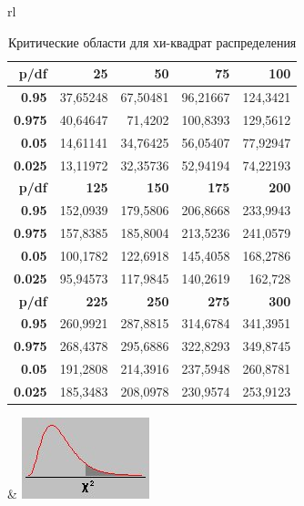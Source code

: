 \documentclass[financial_risks_lectures.tex]{subfiles}
\begin{document}
\begin{frame}[shrink=15]
\begin{table}[htbp]
  \centering
  \caption{Критические области для хи-квадрат распределения}
\begin{tabular}{rl}
    \begin{tabular}{rrrrr}
    \toprule
    \textbf{p/df} & \textbf{25} & \textbf{50} & \textbf{75} & \textbf{100} \\
    \midrule
    \textbf{0.95} & 37,65248 & 67,50481 & 96,21667 & 124,3421 \\
    \textbf{0.975} & 40,64647 & 71,4202 & 100,8393 & 129,5612 \\
    \textbf{0.05} & 14,61141 & 34,76425 & 56,05407 & 77,92947 \\
    \textbf{0.025} & 13,11972 & 32,35736 & 52,94194 & 74,22193 \\
    \bottomrule
    \textbf{p/df} & \textbf{125} & \textbf{150} & \textbf{175} & \textbf{200} \\
    \bottomrule
    \textbf{0.95} & 152,0939 & 179,5806 & 206,8668 & 233,9943 \\
    \textbf{0.975} & 157,8385 & 185,8004 & 213,5236 & 241,0579 \\
    \textbf{0.05} & 100,1782 & 122,6918 & 145,4058 & 168,2786 \\
    \textbf{0.025} & 95,94573 & 117,9845 & 140,2619 & 162,728 \\
    \bottomrule
    \textbf{p/df} & \textbf{225} & \textbf{250} & \textbf{275} & \textbf{300} \\
    \bottomrule
    \textbf{0.95} & 260,9921 & 287,8815 & 314,6784 & 341,3951 \\
    \textbf{0.975} & 268,4378 & 295,6886 & 322,8293 & 349,8745 \\
    \textbf{0.05} & 191,2808 & 214,3916 & 237,5948 & 260,8781 \\
    \textbf{0.025} & 185,3483 & 208,0978 & 230,9574 & 253,9123 \\
    \bottomrule
    \end{tabular}%
&
\includegraphics[scale=0.6]{img/chi2area.png}\\
\end{tabular}
  \label{tab:addlabel}%
\end{table}
\end{frame}
\end{document}
